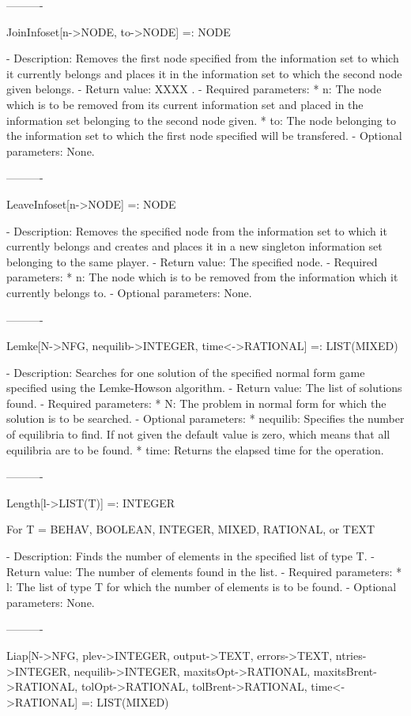 ----------

JoinInfoset[n->NODE, to->NODE] =: NODE

   -	Description:  Removes the first node specified from the information set
	to which it currently belongs and places it in the information set to
	which the second node given belongs.
   -	Return value:  XXXX .
   -	Required parameters:
	  *  n:  The node which is to be removed from its current information
		set and placed in the information set belonging to the second
		node given.
	  *  to:  The node belonging to the information set to which the first
		node specified will be transfered.
   -	Optional parameters:  None.

----------

LeaveInfoset[n->NODE] =: NODE

   -	Description:  Removes the specified node from the information set to
	which it currently belongs and creates and places it in a new singleton
	information set belonging to the same player.
   -	Return value:  The specified node.
   -	Required parameters:
	  *  n:  The node which is to be removed from the information which it
		currently belongs to.
   -	Optional parameters:  None.

----------

Lemke[N->NFG, {nequilib->INTEGER}, {time<->RATIONAL}] =: LIST(MIXED)

   -	Description:  Searches for one solution of the specified normal form 
	game specified using the Lemke-Howson algorithm.  
   -	Return value:  The list of solutions found.
   -	Required parameters:
	  *  N:  The problem in normal form for which the solution is to be 
		searched.
   -	Optional parameters: 
	  *  nequilib:  Specifies the number of equilibria to find.  If not
		given the default value is zero, which means that all 
		equilibria are to be found.
	  *  time:  Returns the elapsed time for the operation.

----------

Length[l->LIST(T)] =: INTEGER

	For T = BEHAV, BOOLEAN, INTEGER, MIXED, RATIONAL, or TEXT

   -	Description:  Finds the number of elements in the specified list of 
	type T.
   -	Return value:  The number of elements found in the list.
   -	Required parameters:
	  *  l:  The list of type T for which the number of elements is to be 
		found.
   -	Optional parameters:  None.

----------

Liap[N->NFG, {plev->INTEGER}, {output->TEXT}, {errors->TEXT}, 
	{ntries->INTEGER}, {nequilib->INTEGER}, {maxitsOpt->RATIONAL},
	{maxitsBrent->RATIONAL}, {tolOpt->RATIONAL}, {tolBrent->RATIONAL},
	{time<->RATIONAL}] =: LIST(MIXED)


